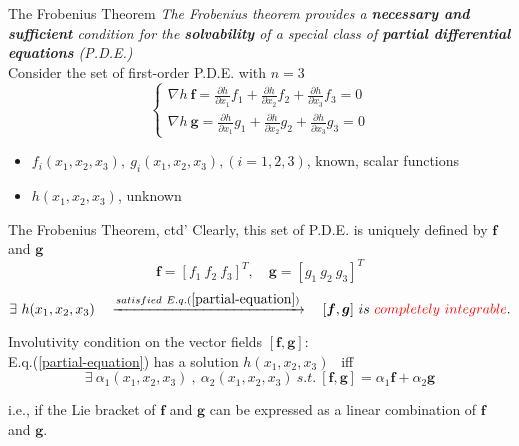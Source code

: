 \documentclass{beamer}
\renewcommand{\vec}[1]{\ensuremath{\boldsymbol{#1}}} %
\begin{document}
\begin{frame}{The Frobenius Theorem}
    \textit{The Frobenius theorem provides a \textbf{necessary and sufficient} condition for the \textbf{solvability} of a special class of \textbf{partial differential equations} (P.D.E.)}
    \\
    Consider the set of first-order P.D.E. with $n=3$
    \begin{equation}\label{partial-equation}
      \left\{ \begin{array}{c}
                \nabla h~\vec{f}=\frac{\partial h}{\partial x_{1}}f_{1}+\frac{\partial h}{\partial x_{2}}f_{2}+\frac{\partial h}{\partial x_{3}}f_{3}=0 \\
                \nabla h~\vec{g}=\frac{\partial h}{\partial x_{1}}g_{1}+\frac{\partial h}{\partial x_{2}}g_{2}+\frac{\partial h}{\partial x_{3}}g_{3}=0
              \end{array}\right.
    \end{equation}

    \begin{itemize}
      \item $f_{i}(x_{1},x_{2},x_{3}),~g_{i}(x_{1},x_{2},x_{3}), (i=1,2,3)$, known, scalar functions
      \item $h(x_{1},x_{2},x_{3})$, unknown
    \end{itemize}
\end{frame}


\begin{frame}{The Frobenius Theorem, ctd'}
    Clearly, this set of P.D.E. is uniquely defined by \vec{f} and \vec{g}
    $$
    \vec{f}=[f_{1}~f_{2}~f_{3}]^{T},\quad \vec{g}=[g_{1}~g_{2}~g_{3}]^{T}
    $$
    \vspace{-10pt}
    $$
    \exists ~h(x_{1},x_{2},x_{3}) \quad \xrightarrow{satisfied~E.q.(\ref{partial-equation})} \quad [\vec{f}, \vec{g}] ~is ~{\color{red}completely ~integrable}.
    $$

    {\color{red} Involutivity condition} on the vector fields $[\vec{f}, \vec{g}]$:\\
    E.q.(\ref{partial-equation}) has a solution $h(x_{1},x_{2},x_{3})$ ~iff
    $$\exists ~\alpha_{1}(x_{1},x_{2},x_{3})~,~\alpha_{2}(x_{1},x_{2},x_{3}) ~s.t.~[\vec{f},\vec{g}] = \alpha_{1}\vec{f}+\alpha_{2}\vec{g}$$

    i.e., if the Lie bracket of \vec{f} and \vec{g} can be expressed as a {\color{red}linear combination} of \vec{f} and \vec{g}.
\end{frame}
\end{document}
